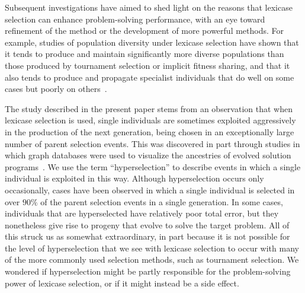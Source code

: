 \documentclass{sig-alternate}
\begin{document}
Subsequent investigations have aimed to shed light on the reasons that lexicase selection can enhance problem-solving performance, with an eye toward refinement of the method or the development of more powerful methods. For example, studies of population diversity under lexicase selection have shown that it tends to produce and maintain significantly more diverse populations than those produced by tournament selection or implicit fitness sharing, and that it also tends to produce and propagate specialist individuals that do well on some cases but poorly on others~\cite{Helmuth:2015:GPTP,Helmuth:2015:dissertation}.

The study described in the present paper stems from an observation that when lexicase selection is used, single individuals are sometimes exploited aggressively in the production of the next generation, being chosen in an exceptionally large number of parent selection events. This was discovered in part through studies in which graph databases were used to visualize the ancestries of evolved solution programs~\cite{McPhee:2015:GPTP}. We use the term ``hyperselection'' to describe events in which a single individual is exploited in this way. Although hyperselection occurs only occasionally, cases have been observed in which a single individual is selected in over $90\%$ of the parent selection events in a single generation. In some cases, individuals that are hyperselected have relatively poor total error, but they nonetheless give rise to progeny that evolve to solve the target problem. All of this struck us as somewhat extraordinary, in part because it is not possible for the level of hyperselection that we see with lexicase selection to occur with many of the more commonly used selection methods, such as tournament selection. We wondered if hyperselection might be partly responsible for the problem-solving power of lexicase selection, or if it might instead be a side effect.
\end{document}
